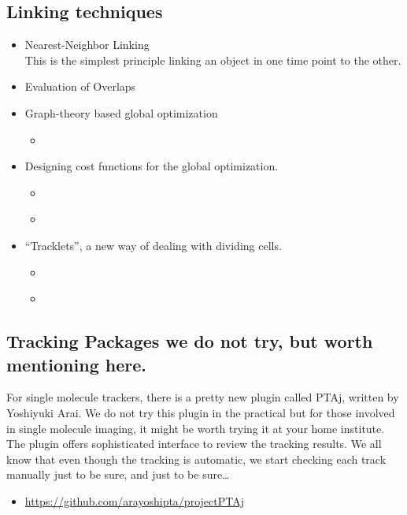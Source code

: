 \documentclass[11pnt]{article}
\begin{document}
\subsection{Linking techniques}

\begin{itemize}
	\item Nearest-Neighbor Linking\\
	This is the simplest principle linking an object in one time point to the other. 
	\item Evaluation of Overlaps
	\item Graph-theory based global optimization
	\begin{itemize}
		\item \cite{Vallotton2003a}
	\end{itemize}
	\item Designing cost functions for the global optimization. 
	\begin{itemize}
		\item \cite{Sbalzarini2005a}
		\item \cite{Sbalzarini2006a}
	\end{itemize}
	\item ``Tracklets'', a new way of dealing with dividing cells.
	\begin{itemize}
		\item \cite{Jaqaman2009a}
		\item \cite{Bise2011}
	\end{itemize}
\end{itemize}

\subsection{Tracking Packages we do not try, but worth mentioning here.}

For single molecule trackers, there is a pretty new plugin called PTAj, written by Yoshiyuki Arai. We do not try this plugin in the practical but for those involved in single molecule imaging, it might be worth trying it at your home institute. The plugin offers sophisticated interface to review the tracking results. We all know that even though the tracking is automatic, we start checking each track manually just to be sure, and just to be sure\dots

\begin{itemize}
\item \url{https://github.com/arayoshipta/projectPTAj}
\end{itemize}
\end{document}
